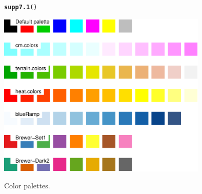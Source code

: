 \documentclass[12pt, a4paper,  BCOR=8.25mm, DIV=15]{scrartcl}\usepackage[]{graphicx}\usepackage[]{color}
\makeatletter
\newcommand{\hlstd}[1]{\textcolor[rgb]{0.345,0.345,0.345}{#1}}%
\newcommand{\hlkwd}[1]{\textcolor[rgb]{0.737,0.353,0.396}{\textbf{#1}}}%
\newenvironment{kframe}{%
 \def\at@end@of@kframe{}%
 \ifinner\ifhmode%
  \def\at@end@of@kframe{\end{minipage}}%
  \begin{minipage}{\columnwidth}%
 \fi\fi%
 \def\FrameCommand##1{\hskip\@totalleftmargin \hskip-\fboxsep
 \colorbox{shadecolor}{##1}\hskip-\fboxsep
     \hskip-\linewidth \hskip-\@totalleftmargin \hskip\columnwidth}%
 \MakeFramed {\advance\hsize-\width
   \@totalleftmargin\z@ \linewidth\hsize
   \@setminipage}}%
 {\par\unskip\endMakeFramed%
 \at@end@of@kframe}
\newenvironment{knitrout}{}{} %
\makeatother
\begin{document}
\begin{suppfigure}[ht]
\begin{knitrout}
\color{fgcolor}\begin{kframe}
\begin{alltt}
\hlkwd{supp7.1}\hlstd{()}
\end{alltt}
\end{kframe}

{\centering \includegraphics[width=0.75\textwidth]{figure/gph-supp7_1e-1} 

}



\end{knitrout}
\caption{Color palettes.}\label{fig:colpal}
\end{suppfigure}
\end{document}
